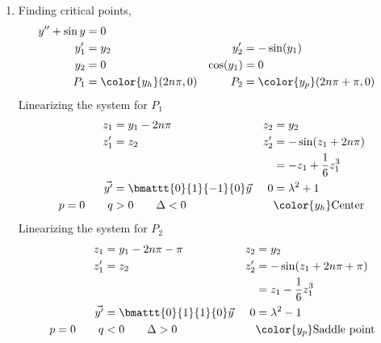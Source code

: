 \begin{enumerate}
    \item Finding critical points,
          \begin{align}
              y'' + \sin y & = 0                              \\
              y_1'         & = y_2                          &
              y_2'         & = -\sin(y_1)                     \\
              y_2          & = 0                            &
              \cos(y_1)    & = 0                              \\
              P_1          & = \color{y_h}(2n\pi, 0)        &
              P_2          & = \color{y_p} (2n\pi + \pi, 0)   \\
          \end{align}
          Linearizing the system for $ P_1 $
          \begin{align}
              z_1            & = y_1 - 2n\pi                  &
              z_2            & = y_2                            \\
              z_1'           & = z_2                          &
              z_2'           & = -\sin(z_1 + 2n\pi)             \\
                             &                                &
                             & = -z_1 + \frac{1}{6}z_1^{3}      \\
              \vec{y'}       & = \bmattt{0}{1}{-1}{0} \vec{y} &
              0              & = \lambda^{2} + 1                \\
              p = 0 \qquad q & > 0 \qquad \Delta < 0          &
                             & \color{y_h} \text{Center}
          \end{align}
          Linearizing the system for $ P_2 $
          \begin{align}
              z_1            & = y_1 - 2n\pi - \pi             &
              z_2            & = y_2                             \\
              z_1'           & = z_2                           &
              z_2'           & = -\sin(z_1 + 2n\pi + \pi)        \\
                             &                                 &
                             & = z_1 - \frac{1}{6}z_1^{3}        \\
              \vec{y'}       & = \bmattt{0}{1}{1}{0} \vec{y}   &
              0              & = \lambda^{2} - 1                 \\
              p = 0 \qquad q & < 0 \qquad \Delta > 0           &
                             & \color{y_p} \text{Saddle point}
          \end{align}


\end{enumerate}
